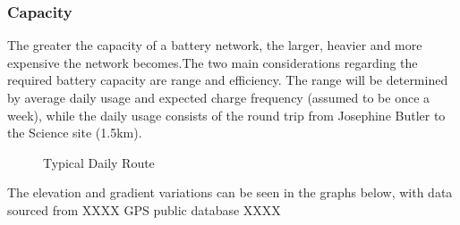 \documentclass[journal,10pt]{IEEEtran}
\begin{document}
        \subsubsection{Capacity}
            The greater the capacity of a battery network, the larger, heavier and more expensive the network becomes.The two main considerations regarding the required battery capacity are range and efficiency. The range will be determined by average daily usage and expected charge frequency (assumed to be once a week), while the daily usage consists of the round trip from Josephine Butler to the Science site (1.5km).
            \begin{figure}[H]
                \centering
                \caption{Typical Daily Route}
                \label{fig:route}
            \end{figure}
            The elevation and gradient variations can be seen in the graphs below, with data sourced from XXXX GPS public database XXXX
\end{document}
